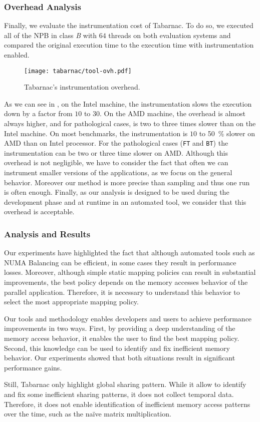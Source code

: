 \subsubsection{Overhead Analysis}

Finally,  we evaluate the instrumentation cost of \gls{Tabarnac}.
To do so, we executed all of the \gls{NPB} in class \emph{B} with $64$ threads on both evaluation systems and compared the original execution time to the execution time with instrumentation enabled.

\begin{figure}[htb]
    \centering
    \texttt{[image: tabarnac/tool-ovh.pdf]}
    \caption{Tabarnac's instrumentation overhead.}
    \label{fig:ovh-tabarnac}
\end{figure}

As we can see in , on the Intel machine, the instrumentation slows the execution down by a factor from $10$ to $30$.
On the AMD machine, the overhead is almost always higher, and for pathological cases, is two to three times slower than on the Intel machine.
On most benchmarks, the instrumentation is $10$ to \SI{50}{\%} slower on AMD than on Intel processor.
For the pathological cases (\texttt{FT} and \texttt{BT}) the instrumentation can be two or three time slower on AMD.
Although this overhead is not negligible, we have to consider the fact that often we can instrument smaller versions of the applications, as we focus on the general behavior.
Moreover our method is more precise than sampling and thus one run is often enough.
Finally, as our analysis is designed to be used during the development phase and at runtime in an automated tool, we consider that this overhead is acceptable.


\subsubsection{Analysis and Results}

Our experiments have highlighted the fact that although automated tools such as \gls{NUMA} Balancing can be efficient, in some cases they result in performance losses.
Moreover, although simple static mapping policies can result in substantial improvements, the best policy depends on the memory accesses behavior of the parallel application.
Therefore, it is necessary to understand this behavior to select the most appropriate mapping policy.

Our tools and methodology enables developers and users to achieve performance improvements in two ways.
First, by providing a deep understanding of the memory access behavior, it enables the user to find the best mapping policy.
Second, this knowledge can be used to identify and fix inefficient memory behavior.
Our experiments showed that both situations result in significant performance gains.

Still, \gls{Tabarnac} only highlight global sharing pattern.
While it allow to identify and fix some inefficient sharing patterns, it does not collect temporal data.
Therefore, it does not enable identification of inefficient memory access patterns over the time, such as the naïve matrix multiplication.

